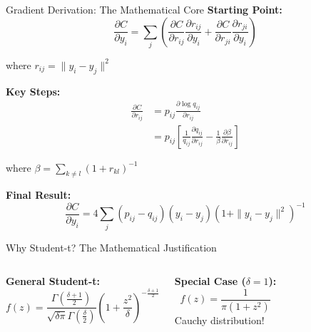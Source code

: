 \begin{frame}{Gradient Derivation: The Mathematical Core}
\textbf{Starting Point:}
$$\frac{\partial C}{\partial y_i} = \sum_j \left(\frac{\partial C}{\partial r_{ij}} \frac{\partial r_{ij}}{\partial y_i} + \frac{\partial C}{\partial r_{ji}} \frac{\partial r_{ji}}{\partial y_i}\right)$$

where $r_{ij} = \|y_i - y_j\|^2$

\textbf{Key Steps:}
\begin{align*}
\frac{\partial C}{\partial r_{ij}} &= p_{ij} \frac{\partial \log q_{ij}}{\partial r_{ij}} \\
&= p_{ij} \left[\frac{1}{q_{ij}} \frac{\partial q_{ij}}{\partial r_{ij}} - \frac{1}{\beta} \frac{\partial \beta}{\partial r_{ij}}\right]
\end{align*}

where $\beta = \sum_{k \neq l} (1 + r_{kl})^{-1}$

\textbf{Final Result:}
$$\boxed{\frac{\partial C}{\partial y_i} = 4\sum_j (p_{ij} - q_{ij})(y_i - y_j)(1 + \|y_i - y_j\|^2)^{-1}}$$
\end{frame}

\begin{frame}{Why Student-t? The Mathematical Justification}
\begin{columns}
\textbf{General Student-t:}
$$f(z) = \frac{\Gamma(\frac{\delta+1}{2})}{\sqrt{\delta\pi}\Gamma(\frac{\delta}{2})}\left(1 + \frac{z^2}{\delta}\right)^{-\frac{\delta+1}{2}}$$

\textbf{Special Case ($\delta=1$):}
$$f(z) = \frac{1}{\pi(1 + z^2)}$$
Cauchy distribution!

\begin{center}
\end{center}
\end{columns}

\vspace{0.3cm}
\end{frame}

